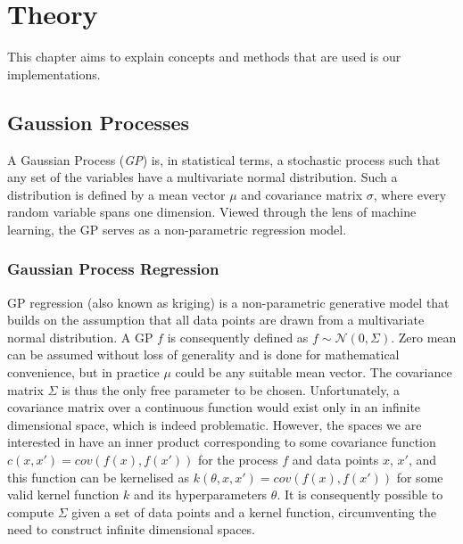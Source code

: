 \chapter{Theory}
\label{cha:theory}
This chapter aims to explain concepts and methods that are used is our implementations.

\section{Gaussion Processes}
A Gaussian Process (\textit{GP}) is, in statistical terms, a stochastic process such that any set of the variables have a multivariate normal distribution. Such a distribution is defined by a mean vector $\mu$ and covariance matrix $\sigma$, where every random variable spans one dimension. Viewed through the lens of machine learning, the GP serves as a non-parametric regression model.

\subsection{Gaussian Process Regression}
GP regression (also known as kriging) is a non-parametric generative model that builds on the assumption that all data points are drawn from a multivariate normal distribution. A GP $f$ is consequently defined as $f \sim \mathcal{N}(0, \Sigma)$. Zero mean can be assumed without loss of generality and is done for mathematical convenience, but in practice $\mu$ could be any suitable mean vector. The covariance matrix $\Sigma$ is thus the only free parameter to be chosen. Unfortunately, a covariance matrix over a continuous function would exist only in an infinite dimensional space, which is indeed problematic. However, the spaces we are interested in have an inner product corresponding to some covariance function $c(x, x') = cov(f(x), f(x'))$ for the process $f$ and data points $x$, $x'$, and this function can be kernelised as $k(\theta, x, x') = cov(f(x), f(x'))$ for some valid kernel function $k$ and its hyperparameters $\theta$. It is consequently possible to compute $\Sigma$ given a set of data points and a kernel function, circumventing the need to construct infinite dimensional spaces.

